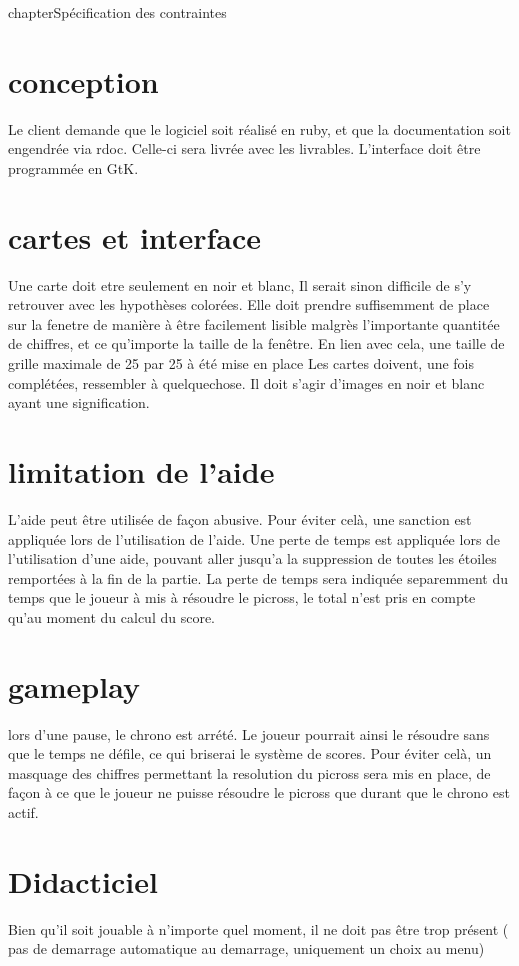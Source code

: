 \documentclass{report}
\begin{document}
chapter{Spécification des contraintes}

	\section{conception}
		Le client demande que le logiciel soit réalisé en ruby, et que la documentation soit engendrée via rdoc. Celle-ci sera livrée avec les livrables. L'interface doit être programmée en GtK.
		
	\section{cartes et interface}
		Une carte doit etre seulement en noir et blanc, Il serait sinon difficile de s'y retrouver avec les hypothèses colorées.
		Elle doit prendre suffisemment de place sur la fenetre de manière à être facilement lisible malgrès l'importante quantitée de chiffres, et ce qu'importe la taille de la fenêtre. En lien avec cela, une taille de grille maximale de 25 par 25 à été mise en place
		Les cartes doivent, une fois complétées, ressembler à quelquechose. Il doit s'agir d'images en noir et blanc ayant une signification.
	
	\section{limitation de l'aide}
		L'aide peut être utilisée de façon abusive. Pour éviter celà, une sanction est appliquée lors de l'utilisation de l'aide. Une perte de temps est appliquée lors de l'utilisation d'une aide, pouvant aller jusqu'a la suppression de toutes les étoiles remportées à la fin de la partie. La perte de temps sera indiquée separemment du temps que le joueur à mis à résoudre le picross, le total n'est pris en compte qu'au moment du calcul du score.
	
	\section{gameplay}
		lors d'une pause, le chrono est arrété. Le joueur pourrait ainsi le résoudre sans que le temps ne défile, ce qui briserai le système de scores. Pour éviter celà, un masquage des chiffres permettant la resolution du picross sera mis en place, de façon à ce que le joueur ne puisse résoudre le picross que durant que le chrono est actif.
		
	\section{Didacticiel}
		Bien qu'il soit jouable à n'importe quel moment, il ne doit pas être trop présent ( pas de demarrage automatique au demarrage, uniquement un choix au menu)
	
\end{document}
